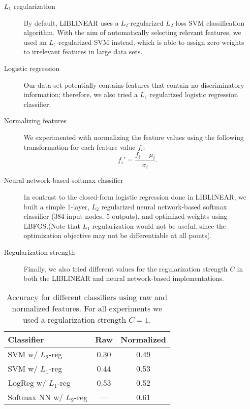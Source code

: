\documentclass[twocolumn, 11pt]{article}
\begin{document}
\begin{description}

  \item[$L_1$ regularization] By default, LIBLINEAR uses a $L_2$-regularized
  $L_2$-loss SVM classification algorithm.  With the aim of automatically
  selecting relevant features, we used an $L_1$-regularized SVM instead, which
  is able to assign zero weights to irrelevant features in large data sets.

  \item[Logistic regression] Our data set potentially contains features that
  contain no discriminatory information; therefore, we also tried a $L_1$
  regularized logistic regression classifier.

  \item[Normalizing features] We experimented with normalizing the feature
  values using the following transformation for each feature value $f_i$:
  \[f_i' = \frac{f_i - \mu_i}{\sigma_i}.\]

  \item[Neural network-based softmax classifier] In contrast to the closed-form
  logistic regression done in LIBLINEAR, we built a simple 1-layer, $L_2$
  regularized neural network-based softmax classifier (384 input nodes, 5
  outputs), and optimized weights using LBFGS.\@ (Note that $L_1$ regularization
  would not be useful, since the optimization objective may not be
  differentiable at all points).

  \item[Regularization strength] Finally, we also tried different values for
  the regularization strength $C$ in both the LIBLINEAR and neural
  network-based implementations.

\end{description}

\begin{table}[b]\centering
  \begin{tabular}{lcc}
    \toprule
    Classifier & Raw  & Normalized \\
    \midrule
    SVM w/ $L_2$-reg & 0.30 & 0.49 \\
    SVM w/ $L_1$-reg & 0.44 & 0.53 \\
    LogReg w/ $L_1$-reg & 0.53 & 0.52  \\
    Softmax NN w/ $L_2$-reg & --- & 0.61  \\ %
    \bottomrule
  \end{tabular}
  \caption{Accuracy for different classifiers using raw and normalized
  features. For all experiments we used a regularization strength
$C=1$.}\label{tab:results}
\end{table}
\end{document}
